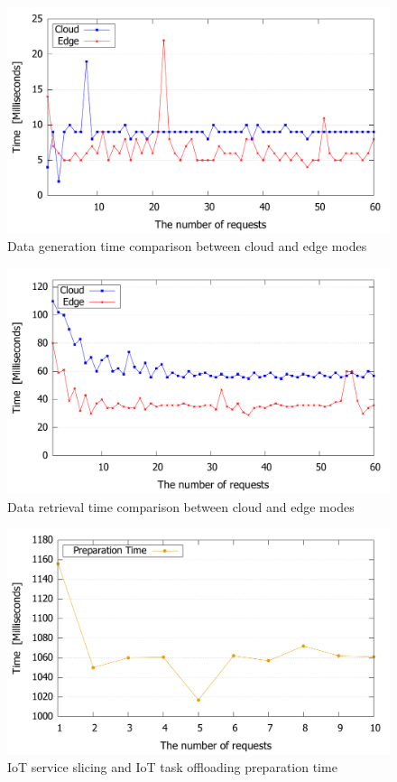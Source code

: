 \begin{figure}[tb!]
\centering
\includegraphics[width=1\columnwidth]
{figures/fig_evaluation_result_creation.pdf}
\caption{Data generation time comparison between cloud and edge modes}
\label{fig:iot_service_slicing_comparison_generation}
\end{figure}

\begin{figure}[tb!]
\centering
\includegraphics[width=1\columnwidth]
{figures/fig_evaluation_result_retrieve.pdf}
\caption{Data retrieval time comparison between cloud and edge modes}
\label{fig:iot_service_slicing_comparison_retrieve}
\end{figure}

\begin{figure}[tb!]
\centering
\includegraphics[width=1\columnwidth]
{figures/fig_evaluation_result_preparation.pdf}
\caption{IoT service slicing and IoT task offloading preparation time}
\label{fig:iot_service_slicing_preparation}
\end{figure}

